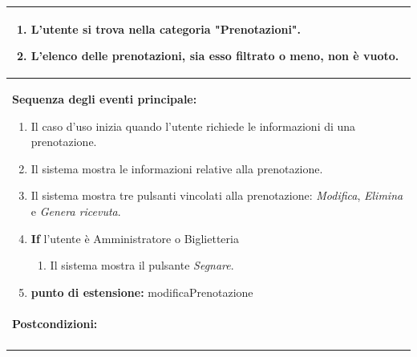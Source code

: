 \documentclass{article}
\begin{document}
\begin{table}[H]
\begin{tabular}{|p{\linewidth}|}
                        \cellcolor{gray!20}
                        \begin{minipage}{\linewidth}
                            \begin{enumerate}
                                \item L'utente si trova nella categoria "Prenotazioni".
                                \item L'elenco delle prenotazioni, sia esso filtrato o meno, non è vuoto.
                            \end{enumerate}
                        \end{minipage}
                        \vspace{-5pt} \\
                        \hline
                        \textbf{Sequenza degli eventi principale:}
                        \begin{enumerate}
                            \item Il caso d'uso inizia quando l'utente richiede le informazioni di una prenotazione.
                            \item Il sistema mostra le informazioni relative alla prenotazione.
                            \item Il sistema mostra tre pulsanti vincolati alla prenotazione: \emph{Modifica}, \emph{Elimina} e \emph{Genera ricevuta}.
                            \item \textbf{If} l'utente è Amministratore o Biglietteria
                            \begin{enumerate}
                                \item Il sistema mostra il pulsante \emph{Segnare}.
                            \end{enumerate}
                            \item[] \textbf{punto di estensione:} modificaPrenotazione
                        \end{enumerate} \\
                        \hline
                        \cellcolor{gray!20}
                        \textbf{Postcondizioni:} \\
                        \cellcolor{gray!20}
                        \begin{minipage}{\linewidth}
                            \begin{enumerate}

\end{enumerate}
\end{minipage}
\end{tabular}
\end{table}
\end{document}
